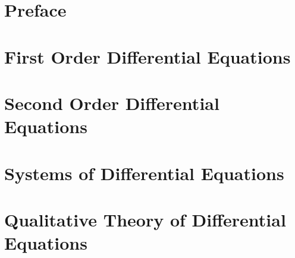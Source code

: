 \documentclass[oneside]{book}
\begin{document}
\pagebreak

\tableofcontents

\setcounter{tocdepth}{4}
\setcounter{secnumdepth}{4}

\pagebreak

\chapter*{Preface}



\mainmatter

\begin{savequote}

\end{savequote}
\chapter{First Order Differential Equations} \label{chapter:firstorder}

    

\begin{savequote}

\end{savequote}
\chapter{Second Order Differential Equations} \label{chapter:secondorder}

    

\begin{savequote}

\end{savequote}
\chapter{Systems of Differential Equations} \label{chapter:systems}

    

\begin{savequote}

\end{savequote}
\chapter{Qualitative Theory of Differential Equations} \label{chapter:qualitativetheory}
\end{document}
